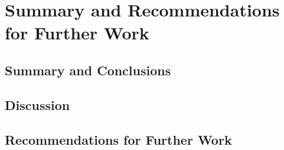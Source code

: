 \chapter[Summary]{Summary and Recommendations for Further Work}


\section{Summary and Conclusions}


\section{Discussion}
\section{Recommendations for Further Work}
